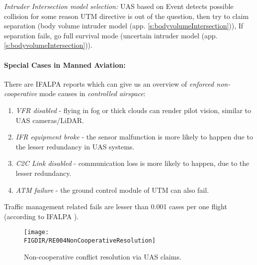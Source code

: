 \begin{note}
    \emph{Intruder Intersection model selection:} UAS based on Event detects possible collision for some reason UTM directive is out of the question, then try to claim separation (body volume intruder model (app. \ref{s:bodyvolumeIntersection})), If separation fails, go full survival mode (uncertain intruder model (app. \ref{s:bodyvolumeIntersection})).
\end{note}

\newpage \paragraph{Special Cases in Manned Aviation:} There are IFALPA reports which can give us an overview of \emph{enforced non-cooperative} mode causes in \emph{controlled airspace}:  
\begin{enumerate}
    \item \emph{VFR disabled} - flying in fog or thick clouds can render pilot vision, similar to UAS cameras/LiDAR.
    
    \item \emph{IFR equipment broke} - the sensor malfunction is more likely to happen due to the lesser redundancy in UAS systems.
    
    \item \emph{C2C Link disabled} - communication loss is more likely to happen, due to the lesser redundancy.
    
    \item \emph{ATM failure} - the ground control module of UTM can also fail.
\end{enumerate}

\begin{note}
    Traffic management related fails are lesser than 0.001 cases per one flight (according to IFALPA \cite{subotic2007recovery}).
\end{note}

\begin{figure}[H]
    \centering
    \texttt{[image: \\FIGDIR/RE004NonCooperativeResolution]} 
    \caption{Non-cooperative conflict resolution via UAS claims.}
    \label{fig:NonCooperativeConflictResolutionUTM}
\end{figure}

